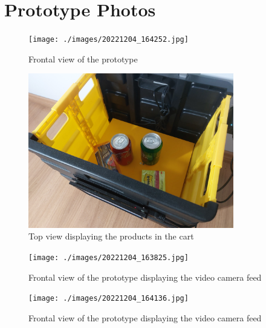 
\chapter{Prototype Photos}\label{app:photos}

\begin{figure}[H]
	\centering
	\caption[Frontal view of the prototype]{Frontal view of the prototype}
	\texttt{[image: ./images/20221204\_164252.jpg]}
    \fonte{}
\end{figure}

\begin{figure}[H]
	\centering
	\caption[Top view displaying the products in the cart]{Top view displaying the products in the cart}
    \includegraphics[width=0.8\textwidth]{./images/20221204_164147.jpg}
    \fonte{}
\end{figure}

\begin{figure}[H]
	\centering
	\caption[Frontal view of the prototype displaying the video camera feed]{Frontal view of the prototype displaying the video camera feed}
    \texttt{[image: ./images/20221204\_163825.jpg]}
    \fonte{}
\end{figure}

\begin{figure}[H]
	\centering
	\caption[Frontal view of the prototype displaying the video camera feed]{Frontal view of the prototype displaying the video camera feed}
    \texttt{[image: ./images/20221204\_164136.jpg]}
    \fonte{}
\end{figure}

